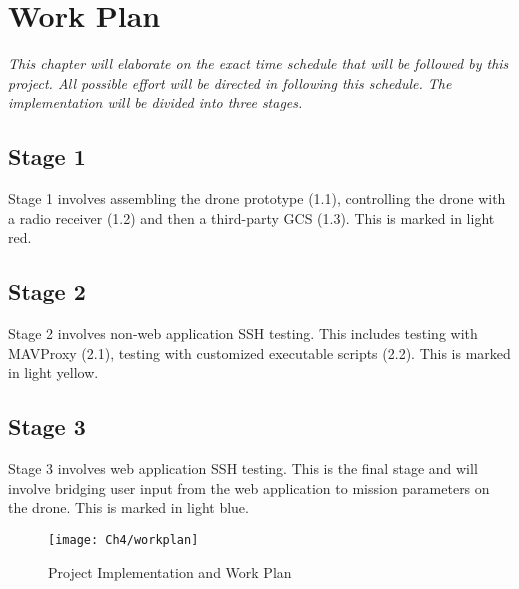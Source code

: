 \setlength{\footskip}{8mm}

\chapter{Work Plan}
\label{ch:workplan}

\textit{This chapter will elaborate on the exact time schedule that will be followed by this project. All possible effort will be directed in following this schedule. The implementation will be divided into three stages. 
}

\section{Stage 1}\label{sect:st1}
Stage 1 involves assembling the drone prototype (1.1), controlling the drone with a radio receiver (1.2) and then a third-party GCS (1.3). This is marked in light red.

\section{Stage 2}\label{sect:st1}
Stage 2 involves non-web application SSH testing. This includes testing with MAVProxy (2.1), testing with customized executable scripts (2.2). This is marked in light yellow.

\section{Stage 3}\label{sect:st1}
Stage 3 involves web application SSH testing. This is the final stage and will involve bridging user input from the web application to mission parameters on the drone. This is marked in light blue.

\begin{figure}[h]
	\texttt{[image: Ch4/workplan]}
	\caption{Project Implementation and Work Plan}
	\label{fig:workplan}
\end{figure}
\FloatBarrier
